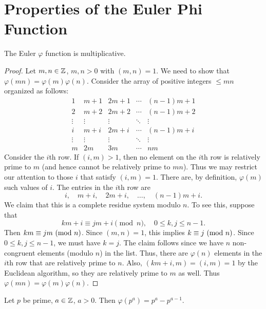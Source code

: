 \section{Properties of the Euler Phi Function}

\begin{theorem}\label{thm:phi-multiplicative}
  The Euler $\varphi$ function is
  multiplicative.
\end{theorem}

\begin{proof}
  Let $m, n \in \mathbb{Z}$, $m, n > 0$ with
  $(m, n) = 1$. We need to show that
  $\varphi(mn) = \varphi(m) \varphi(n)$.
  Consider the array of positive integers
  $\le mn$ organized as follows:
  \[
  \begin{matrix}
    1 & m + 1 & 2m + 1 & \cdots & (n - 1)m + 1 \\
    2 & m + 2 & 2m + 2 & \cdots & (n - 1)m + 2 \\
    \vdots & \vdots & \vdots & \ddots & \vdots \\
    i & m + i & 2m + i & \cdots & (n - 1)m + i \\
    \vdots & \vdots & \vdots & \ddots & \vdots \\
    m & 2m & 3m & \cdots & nm
  \end{matrix}
  \]
  Consider the $i$th row. If $(i, m) > 1$,
  then no element on the $i$th row is
  relatively prime to $m$ (and hence
  cannot be relatively prime to $mn$). Thus
  we may restrict our attention to those
  $i$ that satisfy $(i, m) = 1$. There
  are, by definition, $\varphi(m)$
  such values of $i$. The entries in the
  $i$th row are
  \[
    i, \quad m + i, \quad 2m + i, \quad \dots, \quad (n - 1)m + i.
  \]
  We claim that this is a complete
  residue system modulo $n$. To see this,
  suppose that
  \[
    km + i \equiv jm + i \pmod{n},
    \quad 0 \le k, j \le n - 1.
  \]
  Then $km \equiv jm \ (\mathrm{mod}\ n)$. Since
  $(m, n) = 1$, this implies
  $k \equiv j \ (\mathrm{mod}\ n)$. Since
  $0 \le k, j \le n - 1$, we must have
  $k = j$. The claim follows since
  we have $n$ non-congruent elements
  (modulo $n$)
  in the list. Thus, there are
  $\varphi(n)$ elements in the $i$th row
  that are relatively prime to $n$. Also,
  $(km + i, m) = (i, m) = 1$
  by the Euclidean algorithm, so
  they are relatively prime to $m$ as well. Thus
  $\varphi(mn) = \varphi(m) \varphi(n)$.
\end{proof}

\begin{theorem}
  Let $p$ be prime, $a \in \mathbb{Z}$, $a > 0$.
  Then $\varphi(p^a) = p^a - p^{a - 1}$.
\end{theorem}

